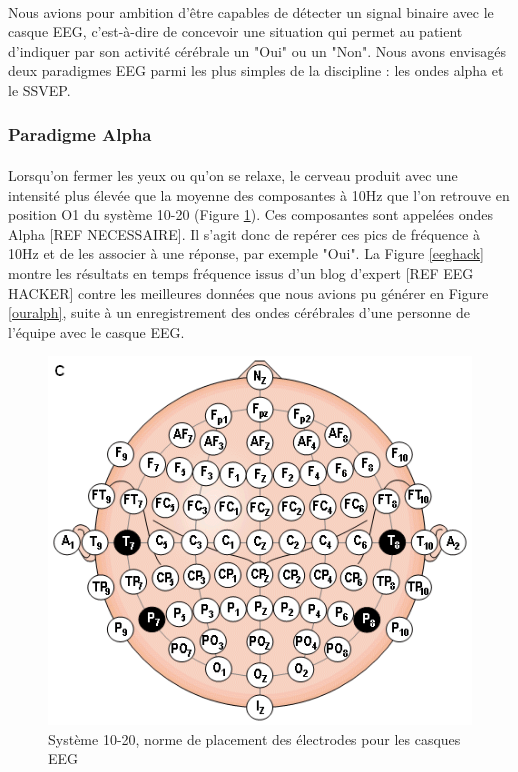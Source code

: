 \documentclass[11pt,a4paper]{article}
\theoremstyle{plain}
\theoremstyle{definition}
\begin{document}
\paragraph{} Nous avions pour ambition d'être capables de détecter un signal binaire avec le casque EEG, c'est-à-dire de concevoir une situation qui permet au patient
d'indiquer par son activité cérébrale un "Oui" ou un "Non". Nous avons envisagés deux paradigmes EEG parmi les plus simples de la discipline : les ondes alpha et 
le SSVEP. 

\subsubsection{Paradigme Alpha}

\paragraph{} Lorsqu'on fermer les yeux ou qu'on se relaxe, le cerveau produit avec une intensité plus élevée que la moyenne des composantes à 10Hz que l'on retrouve en position O1 du système 10-20 (Figure \ref{dix}).
Ces composantes sont appelées ondes Alpha [REF NECESSAIRE]. Il s'agit donc de repérer ces pics de fréquence à 10Hz et de les associer à une réponse, par
exemple "Oui". La Figure \ref{eeghack} montre les résultats en temps fréquence issus d'un blog d'expert [REF EEG HACKER] contre les meilleures données que nous avions pu générer en Figure \ref{ouralph}, suite à un enregistrement des ondes cérébrales d'une personne de l'équipe avec le casque EEG.

\begin{figure}[h!]
\centering
\includegraphics[scale=0.4]{images/1020.png}
\caption{Système 10-20, norme de placement des électrodes pour les casques EEG}
\label{dix}
\end{figure}
\end{document}
